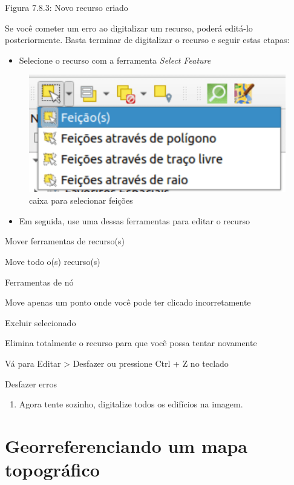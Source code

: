 \documentclass[
]{krantz}
\providecommand{\tightlist}{%
  \setlength{\itemsep}{0pt}\setlength{\parskip}{0pt}}
\begin{document}
Figura 7.8.3: Novo recurso criado

Se você cometer um erro ao digitalizar um recurso, poderá editá-lo posteriormente. Basta terminar de digitalizar o recurso e seguir estas etapas:

\begin{itemize}
\tightlist
\item
  Selecione o recurso com a ferramenta \emph{Select Feature}
\end{itemize}

\begin{figure}
\centering
\includegraphics{media/modulo7/select-feature.png}
\caption{caixa para selecionar feições}
\end{figure}

\begin{itemize}
\tightlist
\item
  Em seguida, use uma dessas ferramentas para editar o recurso
\end{itemize}

Mover ferramentas de recurso(s)

Move todo o(s) recurso(s)

Ferramentas de nó

Move apenas um ponto onde você pode ter clicado incorretamente

Excluir selecionado

Elimina totalmente o recurso para que você possa tentar novamente

Vá para Editar \textgreater{} Desfazer ou pressione Ctrl + Z no teclado

Desfazer erros

\begin{enumerate}
\def\labelenumi{\arabic{enumi}.}
\setcounter{enumi}{16}
\tightlist
\item
  Agora tente sozinho, digitalize todos os edifícios na imagem.
\end{enumerate}

\hypertarget{georreferenciando-um-mapa-topogruxe1fico}{%
\section{Georreferenciando um mapa topográfico}\label{georreferenciando-um-mapa-topogruxe1fico}}
\end{document}
